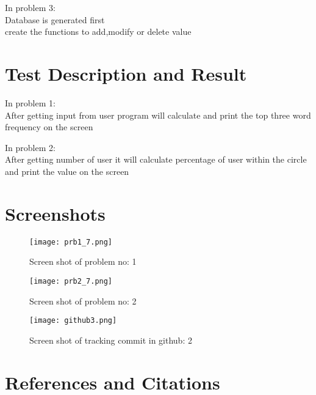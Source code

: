 \documentclass{article}
\begin{document}
In problem 3:\\
Database is generated first\\
create the functions to add,modify or delete value\\

\cleardoublepage

\section{Test Description and Result}
In problem 1:\\
After getting input from user program will calculate and print the top three word frequency on the screen\\
\bigskip
\bigskip

In problem 2:\\
After getting number of user it will calculate percentage of user within the circle and print the value on the screen\\


\bigskip
\bigskip




\cleardoublepage

\section{Screenshots}

\begin{figure}[h]

\texttt{[image: prb1\_7.png]}
\caption{Screen shot of problem no: 1}
\end{figure}

\cleardoublepage

\begin{figure}

\texttt{[image: prb2\_7.png]}
\caption{Screen shot of problem no: 2}
\end{figure}
\cleardoublepage

\begin{figure}

\texttt{[image: github3.png]}
\caption{Screen shot of tracking commit in github: 2}
\end{figure}
\cleardoublepage

\section{References and Citations}
\end{document}
